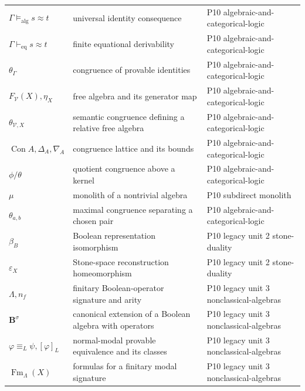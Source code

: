 \begin{longtable}{@{}p{}p{}p{}@{}}
\(\Gamma\models_{\mathrm{alg}}s\approx t\) & universal identity consequence & P10 algebraic-\allowbreak{}and-\allowbreak{}categorical-\allowbreak{}logic \\
\(\Gamma\vdash_{\mathrm{eq}}s\approx t\) & finite equational derivability & P10 algebraic-\allowbreak{}and-\allowbreak{}categorical-\allowbreak{}logic \\
\(\theta_\Gamma\) & congruence of provable identities & P10 algebraic-\allowbreak{}and-\allowbreak{}categorical-\allowbreak{}logic \\
\(F_{\mathcal V}(X),\allowbreak \eta_X\) & free algebra and its generator map & P10 algebraic-\allowbreak{}and-\allowbreak{}categorical-\allowbreak{}logic \\
\(\theta_{\mathcal V,X}\) & semantic congruence defining a relative free algebra & P10 algebraic-\allowbreak{}and-\allowbreak{}categorical-\allowbreak{}logic \\
\(\operatorname{Con}A,\allowbreak \Delta_A,\allowbreak \nabla_A\) & congruence lattice and its bounds & P10 algebraic-\allowbreak{}and-\allowbreak{}categorical-\allowbreak{}logic \\
\(\phi/\theta\) & quotient congruence above a kernel & P10 algebraic-\allowbreak{}and-\allowbreak{}categorical-\allowbreak{}logic \\
\(\mu\) & monolith of a nontrivial algebra & P10 subdirect monolith \\
\(\theta_{a,b}\) & maximal congruence separating a chosen pair & P10 algebraic-\allowbreak{}and-\allowbreak{}categorical-\allowbreak{}logic \\
\(\beta_B\) & Boolean representation isomorphism & P10 legacy unit 2 stone-\allowbreak{}duality \\
\(\varepsilon_X\) & Stone-space reconstruction homeomorphism & P10 legacy unit 2 stone-\allowbreak{}duality \\
\(\Lambda,\allowbreak n_f\) & finitary Boolean-operator signature and arity & P10 legacy unit 3 nonclassical-\allowbreak{}algebras \\
\(\mathbf B^\sigma\) & canonical extension of a Boolean algebra with operators & P10 legacy unit 3 nonclassical-\allowbreak{}algebras \\
\(\varphi\equiv_L\psi,\allowbreak [\varphi]_L\) & normal-modal provable equivalence and its classes & P10 legacy unit 3 nonclassical-\allowbreak{}algebras \\
\(\operatorname{Fm}_\Lambda(X)\) & formulas for a finitary modal signature & P10 legacy unit 3 nonclassical-\allowbreak{}algebras \\

\end{longtable}
